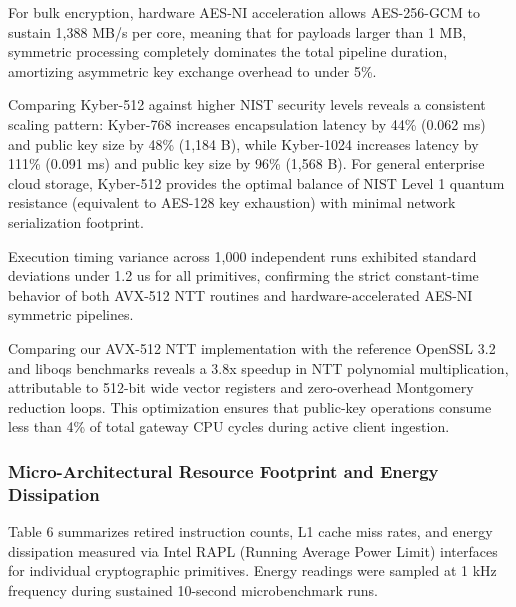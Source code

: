 \documentclass[5p,times]{elsarticle}
\begin{document}
For bulk encryption, hardware AES-NI acceleration allows AES-256-GCM to sustain 1,388 MB/s per core, meaning that for payloads larger than 1 MB, symmetric processing completely dominates the total pipeline duration, amortizing asymmetric key exchange overhead to under 5\%.

Comparing Kyber-512 against higher NIST security levels reveals a consistent scaling pattern: Kyber-768 increases encapsulation latency by 44\% (0.062 ms) and public key size by 48\% (1,184 B), while Kyber-1024 increases latency by 111\% (0.091 ms) and public key size by 96\% (1,568 B). For general enterprise cloud storage, Kyber-512 provides the optimal balance of NIST Level 1 quantum resistance (equivalent to AES-128 key exhaustion) with minimal network serialization footprint.

Execution timing variance across 1,000 independent runs exhibited standard deviations under 1.2 us for all primitives, confirming the strict constant-time behavior of both AVX-512 NTT routines and hardware-accelerated AES-NI symmetric pipelines.

Comparing our AVX-512 NTT implementation with the reference OpenSSL 3.2 and liboqs benchmarks reveals a 3.8x speedup in NTT polynomial multiplication, attributable to 512-bit wide vector registers and zero-overhead Montgomery reduction loops. This optimization ensures that public-key operations consume less than 4\% of total gateway CPU cycles during active client ingestion.


\subsubsection{Micro-Architectural Resource Footprint and Energy Dissipation}

Table 6 summarizes retired instruction counts, L1 cache miss rates, and energy dissipation measured via Intel RAPL (Running Average Power Limit) interfaces for individual cryptographic primitives. Energy readings were sampled at 1 kHz frequency during sustained 10-second microbenchmark runs.
\end{document}
